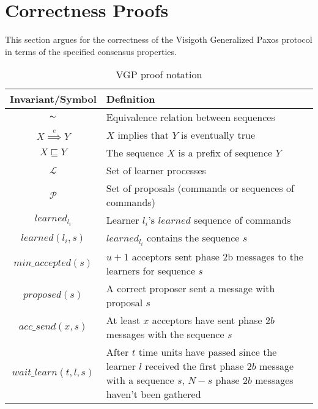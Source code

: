 \section{Correctness Proofs}

This section argues for the correctness of the Visigoth Generalized Paxos protocol in terms of the specified consensus properties.\par


\begin{table}[h!]
	\renewcommand{\arraystretch}{1.5}
	\centering
	\begin{tabularx}{\linewidth}{ |c|X|}
		\hline
		Invariant/Symbol & Definition \\
		\hline
		$\thicksim$ & Equivalence relation between sequences \\
		\hline
		$X \overset{e}{\implies} Y$ & $X$ implies that $Y$ is eventually true \\
		\hline
		$X \sqsubseteq Y$ & The sequence $X$ is a prefix of sequence $Y$ \\
		\hline
		$\mathcal{L}$ & Set of learner processes \\
		\hline
		$\mathcal{P}$ & Set of proposals (commands or sequences of commands) \\
		\hline
		$learned_{l_i}$ & Learner $l_i$'s $learned$ sequence of commands \\
		\hline
		$learned(l_i,s)$ & $learned_{l_i}$ contains the sequence $s$ \\
		\hline
		$min\_accepted(s)$ & $u+1$ acceptors sent phase 2b messages to the learners for sequence $s$ \\
		\hline
		$proposed(s)$ & A correct proposer sent a message with proposal $s$ \\
		\hline
		$acc\_send(x,s)$ & At least $x$ acceptors have sent phase $2b$ messages with the sequence $s$ \\
		\hline
		$wait\_learn(t,l,s)$ & After $t$ time units have passed since the learner $l$ received the first phase $2b$ message with a sequence $s$, $N-s$ phase $2b$ messages haven't been gathered\\
		\hline
  	\end{tabularx} 
	\caption{VGP proof notation} 
	\label{table:vft_proof}
\end{table}

